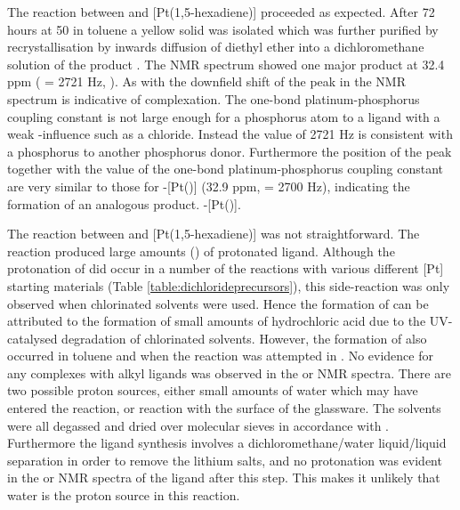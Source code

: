 The reaction between \tBuxantphos{} and [Pt(1,5-hexadiene)] proceeded as expected.  After 72 hours at 50\degC{} in toluene a yellow solid was isolated which was further purified by recrystallisation by inwards diffusion of diethyl ether into a dichloromethane solution of the product .  The \phosphorus{} NMR spectrum showed one major product at 32.4 ppm (\JPtP{} = 2721 Hz, ).  As with \tButhixantphos{} the downfield shift of the peak in the \phosphorus{} NMR spectrum is indicative of complexation.  The one-bond platinum-phosphorus coupling constant is not large enough for a phosphorus atom \trans{} to a ligand with a weak \trans-influence such as a chloride.  Instead the value of 2721 Hz is consistent with a phosphorus \trans{} to another phosphorus donor.  Furthermore the position of the peak together with the value of the one-bond platinum-phosphorus coupling constant are very similar to those for \trans-[Pt(\tButhixantphos)] (32.9 ppm, \JPtP{} = 2700 Hz), indicating the formation of an analogous product.  \trans-[Pt(\tBuxantphos)].

The reaction between \tBusixantphos{} and [Pt(1,5-hexadiene)] was not straightforward.  The reaction produced large amounts () of protonated \tBusixantphos{} ligand.  Although the protonation of \tButhixantphos{} did occur in a number of the reactions with various different [Pt] starting materials (Table \ref{table:dichlorideprecursors}), this side-reaction was only observed when chlorinated solvents were used.  Hence the formation of \tButhixantphos {} can be attributed to the formation of small amounts of hydrochloric acid due to the UV-catalysed degradation of chlorinated solvents.  However, the formation of \tBusixantphos {} also occurred in toluene and when the reaction was attempted in .  No evidence for any complexes with alkyl ligands was observed in the \proton{} or \carbon{} NMR spectra.  There are two possible proton sources, either small amounts of water which may have entered the reaction, or reaction with the surface of the glassware.  The solvents were all degassed and dried over molecular sieves in accordance with .  Furthermore the \tBusixantphos{} ligand synthesis involves a dichloromethane/water liquid/liquid separation in order to remove the lithium salts, and no protonation was evident in the \proton{} or \phosphorus{} NMR spectra of the \tBusixantphos{} ligand after this step.  This makes it unlikely that water is the proton source in this reaction.  

